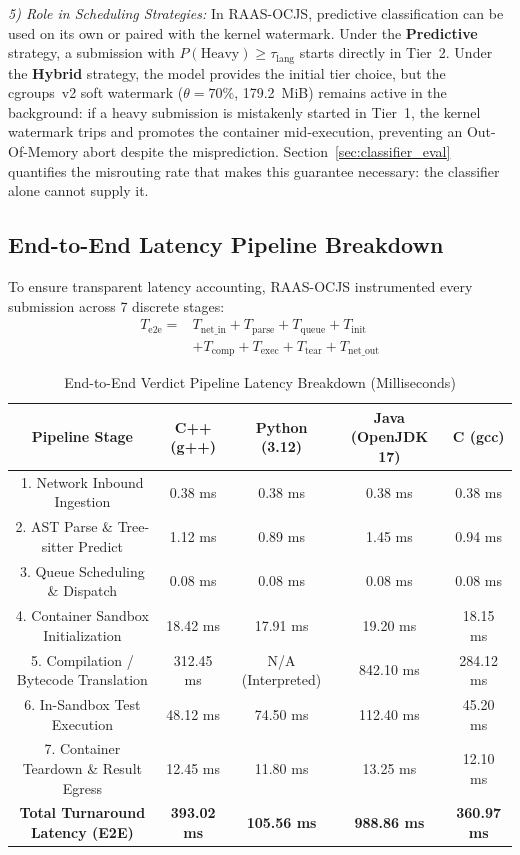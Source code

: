 \documentclass[conference]{IEEEtran}
\begin{document}
\textit{5) Role in Scheduling Strategies:}
In RAAS-OCJS, predictive classification can be used on its own or paired with the kernel watermark. Under the \textbf{Predictive} strategy, a submission with $P(\mathrm{Heavy}) \ge \tau_{\mathrm{lang}}$ starts directly in Tier~2. Under the \textbf{Hybrid} strategy, the model provides the initial tier choice, but the cgroups~v2 soft watermark ($\theta = 70\%$, 179.2~MiB) remains active in the background: if a heavy submission is mistakenly started in Tier~1, the kernel watermark trips and promotes the container mid-execution, preventing an Out-Of-Memory abort despite the misprediction. Section~\ref{sec:classifier_eval} quantifies the misrouting rate that makes this guarantee necessary: the classifier alone cannot supply it.

\subsection{End-to-End Latency Pipeline Breakdown}
To ensure transparent latency accounting, RAAS-OCJS instrumented every submission across 7 discrete stages:
\begin{equation}
\begin{aligned}
T_{\mathrm{e2e}} ={}&
T_{\mathrm{net\_in}} + T_{\mathrm{parse}} +
T_{\mathrm{queue}} + T_{\mathrm{init}} \\
&+ T_{\mathrm{comp}} + T_{\mathrm{exec}} +
T_{\mathrm{tear}} + T_{\mathrm{net\_out}}
\end{aligned}
\end{equation}

\begin{table}[htbp]
\caption{End-to-End Verdict Pipeline Latency Breakdown (Milliseconds)}
\label{tab:e2e_latency}
\begin{center}
\begin{tabular}{|c|c|c|c|c|}
\hline
\textbf{Pipeline Stage} & \textbf{C++ (g++)} & \textbf{Python (3.12)} & \textbf{Java (OpenJDK 17)} & \textbf{C (gcc)} \\
\hline
1. Network Inbound Ingestion & 0.38 ms & 0.38 ms & 0.38 ms & 0.38 ms \\
\hline
2. AST Parse \& Tree-sitter Predict & 1.12 ms & 0.89 ms & 1.45 ms & 0.94 ms \\
\hline
3. Queue Scheduling \& Dispatch & 0.08 ms & 0.08 ms & 0.08 ms & 0.08 ms \\
\hline
4. Container Sandbox Initialization & 18.42 ms & 17.91 ms & 19.20 ms & 18.15 ms \\
\hline
5. Compilation / Bytecode Translation & 312.45 ms & N/A (Interpreted) & 842.10 ms & 284.12 ms \\
\hline
6. In-Sandbox Test Execution & 48.12 ms & 74.50 ms & 112.40 ms & 45.20 ms \\
\hline
7. Container Teardown \& Result Egress & 12.45 ms & 11.80 ms & 13.25 ms & 12.10 ms \\
\hline
\textbf{Total Turnaround Latency (E2E)} & \textbf{393.02 ms} & \textbf{105.56 ms} & \textbf{988.86 ms} & \textbf{360.97 ms} \\
\hline
\end{tabular}
\end{center}
\end{table}
\end{document}
